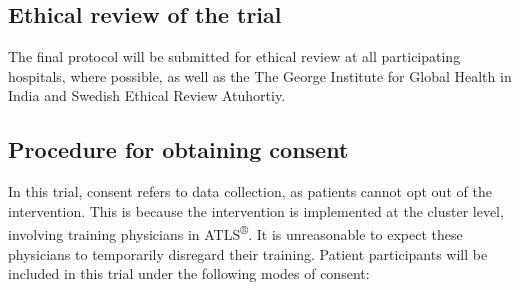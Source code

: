 \documentclass[
]{scrartcl}
\begin{document}
\hypertarget{ethical-review-of-the-trial}{%
\subsection{Ethical review of the
trial}\label{ethical-review-of-the-trial}}

The final protocol will be submitted for ethical review at all
participating hospitals, where possible, as well as the The George
Institute for Global Health in India and Swedish Ethical Review
Atuhortiy.

\hypertarget{procedure-for-obtaining-consent}{%
\subsection{Procedure for obtaining
consent}\label{procedure-for-obtaining-consent}}

In this trial, consent refers to data collection, as patients cannot opt
out of the intervention. This is because the intervention is implemented
at the cluster level, involving training physicians in
ATLS\textsuperscript{®}. It is unreasonable to expect these physicians
to temporarily disregard their training. Patient participants will be
included in this trial under the following modes of consent:
\end{document}
